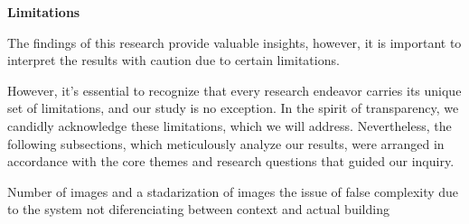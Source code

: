 
\textbf{Limitations}

The findings of this research provide valuable insights, however, it is important to interpret the results with caution due to certain limitations.

However, it's essential to recognize that every research endeavor carries its unique set of limitations, and our study is no exception.
In the spirit of transparency, we candidly acknowledge these limitations, which we will address.
Nevertheless, the following subsections, which meticulously analyze our results, were arranged in accordance with the core themes and research questions that guided our inquiry.

Number of images and a stadarization of images the issue of false complexity due to the system not diferenciating between context and actual building



%
%



